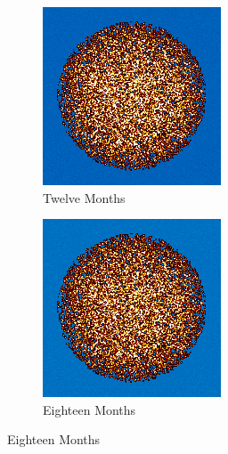 \begin{figure}[H]\ContinuedFloat
\centering

\begin{subfigure}{0.4\textwidth}
  \includegraphics[width=0.95\linewidth]{figures/burn-20-bstep2}
  \caption{Twelve Months}
  \label{fig:bstep2}
\end{subfigure}%
%
\begin{subfigure}{0.4\textwidth}
  \includegraphics[width=0.95\linewidth]{figures/burn-20-bstep3}
  \caption{Eighteen Months}
  \label{fig:bstep3}
\end{subfigure}%


\end{figure}
